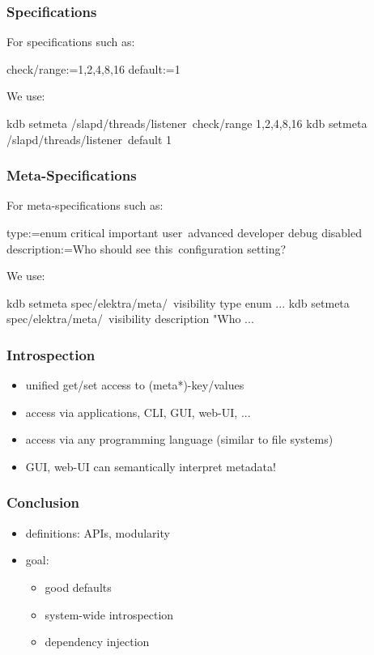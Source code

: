 \begin{frame}[fragile]
	\frametitle{Specifications}
	For specifications such as:

	\begin{code}
	  check/range:=1,2,4,8,16
	  default:=1
	\end{code}

	We use:

	\begin{code}[language=bash,morekeywords={setmeta}]
	kdb setmeta /slapd/threads/listener\
		check/range 1,2,4,8,16
	kdb setmeta /slapd/threads/listener\
	       	default 1
	\end{code}
\end{frame}

\begin{frame}[fragile]
	\frametitle{Meta-Specifications}
	For meta-specifications such as:

	\small
	\begin{code}
	[visibility]
	type:=enum critical important user\
	      advanced developer debug disabled
	description:=Who should see this\
	     configuration setting?
	\end{code}

	We use:

	\begin{code}[language=bash,morekeywords={setmeta}]
	kdb setmeta spec/elektra/meta/\
		visibility type enum ...
	kdb setmeta spec/elektra/meta/\
		visibility description "Who ...
	\end{code}
\end{frame}

\begin{frame}
	\frametitle{Introspection}
	\begin{itemize}
	\item unified get/set access to (meta*)-key/values
	\item access via applications, CLI, GUI, web-UI, ...
	\item access via any programming language (similar to file systems)
	\item GUI, web-UI can semantically interpret metadata!
	\end{itemize}
\end{frame}



\begin{frame}
	\frametitle{Conclusion}
	\begin{itemize}
	\item definitions: APIs, modularity
	\item goal:
	\begin{itemize}
	\item good defaults
	\item system-wide introspection
	\item dependency injection
	\end{itemize}
	\end{itemize}
\end{frame}



